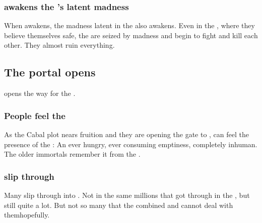 \subsubsection{\Lithrim awakens the \resphain's latent madness}
When \Lithrim awakens, the madness latent in the \resphain also awakens. 
Even in the , where they believe themselves safe, the \resphain are seized by madness and begin to fight and kill each other.
They almost ruin everything. 










\subsection{The portal opens}
\Lithrim{} opens the way for the \Voidbringer. 






\subsubsection{People feel the \Voidbringer}
As the Cabal plot nears fruition and they are opening the gate to \Erebos, \Miithians can feel the presence of the \Voidbringer: 
An ever hungry, ever consuming emptiness, completely inhuman. 
The older immortals remember it from the \secondbanewar. 





\subsubsection{\Banes{} slip through}
Many \lesserbanes{} slip through into \Miith. 
Not in the same millions that got through in the \secondbanewar, but still quite a lot. 
But not so many that the combined \dragons{} and \resphain{} cannot deal with them\prikker hopefully. 

















